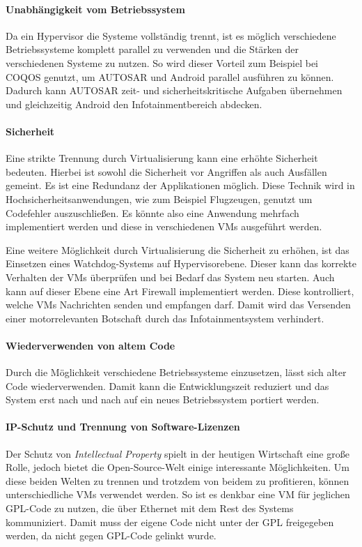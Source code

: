 \documentclass[
  a4paper,					    %
  twoside,
  DIV=calc,     				%
  bibliography=totoc,
  cleardoublepage=empty,
  ngerman,     					%
  final       					%
]{scrbook}
\begin{document}
\paragraph{Unabhängigkeit vom Betriebssystem}
Da ein Hypervisor die Systeme vollständig trennt, ist es möglich verschiedene Betriebssysteme komplett parallel zu verwenden und die Stärken der verschiedenen Systeme zu nutzen. So wird dieser Vorteil zum Beispiel bei COQOS genutzt, um AUTOSAR und Android parallel ausführen zu können. Dadurch kann AUTOSAR zeit- und sicherheitskritische Aufgaben übernehmen und gleichzeitig Android den Infotainmentbereich abdecken.

\paragraph{Sicherheit}
Eine strikte Trennung durch Virtualisierung kann eine erhöhte Sicherheit bedeuten. Hierbei ist sowohl die Sicherheit vor Angriffen als auch Ausfällen gemeint. Es ist eine Redundanz der Applikationen möglich. Diese Technik wird in Hochsicherheitsanwendungen, wie zum Beispiel Flugzeugen, genutzt um Codefehler auszuschließen. Es könnte also eine Anwendung mehrfach implementiert werden und diese in verschiedenen VMs ausgeführt werden.

Eine weitere Möglichkeit durch Virtualisierung die Sicherheit zu erhöhen, ist das Einsetzen eines Watchdog-Systems auf Hypervisorebene. Dieser kann das korrekte Verhalten der VMs überprüfen und bei Bedarf das System neu starten. Auch kann auf dieser Ebene eine Art Firewall implementiert werden. Diese kontrolliert, welche VMs Nachrichten senden und empfangen darf. Damit wird das Versenden einer motorrelevanten Botschaft durch das Infotainmentsystem verhindert.

\paragraph{Wiederverwenden von altem Code}
Durch die Möglichkeit verschiedene Betriebssysteme einzusetzen, lässt sich alter Code wiederverwenden. Damit kann die Entwicklungszeit reduziert und das System erst nach und nach auf ein neues Betriebssystem portiert werden.

\paragraph{IP-Schutz und Trennung von Software-Lizenzen}
Der Schutz von \emph{Intellectual Property} spielt in der heutigen Wirtschaft eine große Rolle, jedoch bietet die Open-Source-Welt einige interessante Möglichkeiten. Um diese beiden Welten zu trennen und trotzdem von beidem zu profitieren, können unterschiedliche VMs verwendet werden. So ist es denkbar eine VM für jeglichen GPL-Code zu nutzen, die über Ethernet mit dem Rest des Systems kommuniziert. Damit muss der eigene Code nicht unter der GPL freigegeben werden, da nicht gegen GPL-Code gelinkt wurde.
\end{document}
